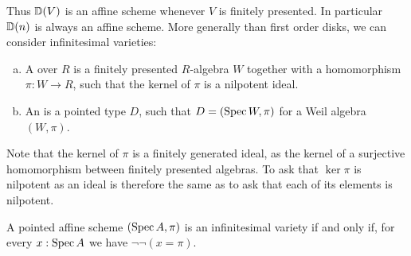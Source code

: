 Thus $\mathbb{D}(V)$ is an affine scheme whenever $V$ is finitely presented. In particular
$\mathbb{D}(n)$ is always an affine scheme. %
%
More generally than first order disks, we can consider infinitesimal varieties:

\begin{definition}
  \begin{enumerate}[(a)]
  \item A  over $R$ is a finitely presented $R$-algebra
    $W$ together with a homomorphism $\pi : W \to R$, such that the kernel of $\pi$ is a nilpotent ideal.
  \item An  is a pointed type $D$,
    such that $D = (\operatorname{Spec} W, \pi)$ for a Weil algebra $(W, \pi)$.
  \end{enumerate}
\end{definition}

Note that the kernel of $\pi$ is a finitely generated ideal,
as the kernel of a surjective homomorphism between finitely presented algebras.
To ask that $\ker \pi$ is nilpotent as an ideal
is therefore the same as to ask that each of its elements is nilpotent.

\begin{lemma}%
  \label{characterization-infinitesimal-variety}
  A pointed affine scheme $(\operatorname{Spec} A, \pi)$
  is an infinitesimal variety
  if and only if,
  for every $x : \operatorname{Spec} A$ we have $\lnot \lnot (x = \pi)$.
\end{lemma}

